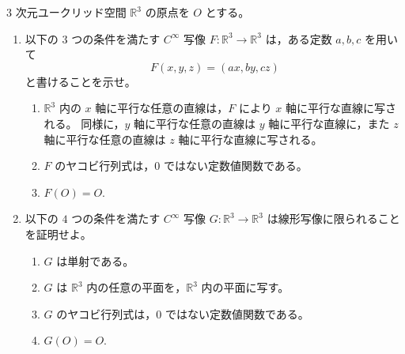\newcommand{\C}{\mathbb{C}}
\newcommand{\R}{\mathbb{R}}
\newcommand{\Z}{\mathbb{Z}}
\newcommand{\Tr}{\operatorname{Tr}}
\newcommand{\Impart}{\operatorname{Im}}
\newcommand{\AF}{\operatorname{AF}}
\newcommand{\AX}{\operatorname{AX}}
\newcommand{\GL}{\operatorname{GL}}


\(3\) 次元ユークリッド空間 \(\R^3\) の原点を \(O\) とする。

\begin{enumerate}
  \item 以下の \(3\) つの条件を満たす \(C^\infty\) 写像 \(F:\R^3\to\R^3\) は，ある定数 \(a,b,c\) を用いて
  \[
    F(x,y,z)=(ax,by,cz)
  \]
  と書けることを示せ。
  \begin{enumerate}
    \item[(i)] \(\R^3\) 内の \(x\) 軸に平行な任意の直線は，\(F\) により \(x\) 軸に平行な直線に写される。
    同様に，\(y\) 軸に平行な任意の直線は \(y\) 軸に平行な直線に，また \(z\) 軸に平行な任意の直線は \(z\) 軸に平行な直線に写される。
    \item[(ii)] \(F\) のヤコビ行列式は，\(0\) ではない定数値関数である。
    \item[(iii)] \(F(O)=O\).
  \end{enumerate}
  \item 以下の \(4\) つの条件を満たす \(C^\infty\) 写像 \(G:\R^3\to\R^3\) は線形写像に限られることを証明せよ。
  \begin{enumerate}
    \item[(o)] \(G\) は単射である。
    \item[(i)] \(G\) は \(\R^3\) 内の任意の平面を，\(\R^3\) 内の平面に写す。
    \item[(ii)] \(G\) のヤコビ行列式は，\(0\) ではない定数値関数である。
    \item[(iii)] \(G(O)=O\).
  \end{enumerate}
\end{enumerate}

%